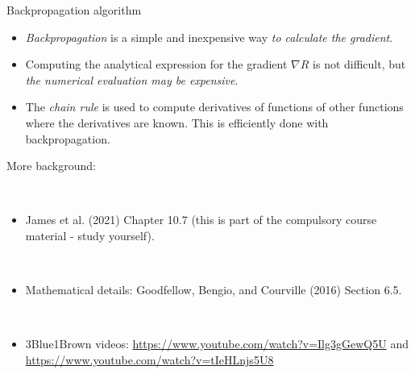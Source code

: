 \documentclass[
  10pt,
  ignorenonframetext,
]{beamer}
\providecommand{\tightlist}{%
  \setlength{\itemsep}{0pt}\setlength{\parskip}{0pt}}
\begin{document}
\begin{frame}
\begin{block}{Backpropagation algorithm}
\protect\hypertarget{backpropagation-algorithm}{}
\(~\)

\begin{itemize}
\tightlist
\item
  \emph{Backpropagation} is a simple and inexpensive way \emph{to
  calculate the gradient}.
\end{itemize}

\vspace{2mm}

\begin{itemize}
\tightlist
\item
  Computing the analytical expression for the gradient \(\nabla R\) is
  not difficult, but \emph{the numerical evaluation may be expensive}.
\end{itemize}

\vspace{2mm}

\vspace{2mm}

\begin{itemize}
\tightlist
\item
  The \emph{chain rule} is used to compute derivatives of functions of
  other functions where the derivatives are known. This is efficiently
  done with backpropagation.
\end{itemize}
\end{block}
\end{frame}

\begin{frame}
More background:

\(~\)

\begin{itemize}
\tightlist
\item
  James et al. (2021) Chapter 10.7 (this is part of the compulsory
  course material - study yourself).
\end{itemize}

\(~\)

\begin{itemize}
\tightlist
\item
  Mathematical details: Goodfellow, Bengio, and Courville (2016) Section
  6.5.\\
\end{itemize}

\(~\)

\begin{itemize}
\tightlist
\item
  3Blue1Brown videos: \url{https://www.youtube.com/watch?v=Ilg3gGewQ5U}
  and \url{https://www.youtube.com/watch?v=tIeHLnjs5U8}
\end{itemize}
\end{frame}
\end{document}
